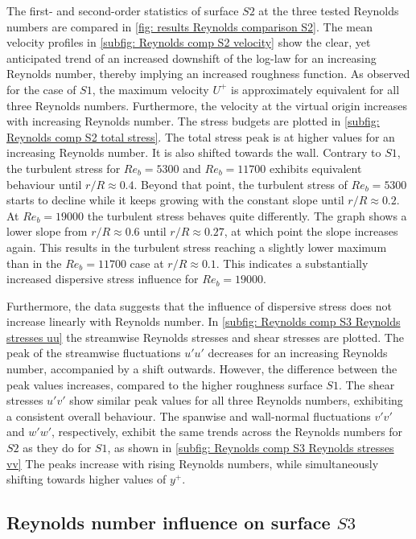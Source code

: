 The first- and second-order statistics of surface $S2$ at the three tested Reynolds numbers are compared in \autoref{fig: results Reynolds comparison S2}.
The mean velocity profiles in \autoref{subfig: Reynolds comp S2 velocity} show the clear, yet anticipated  trend of an increased downshift of the log-law for an increasing Reynolds number, thereby implying an increased roughness function.
As observed for the case of $S1$, the maximum velocity $U^+$ is approximately equivalent  for all three Reynolds numbers.
Furthermore, the velocity at the virtual origin increases with increasing Reynolds number.
The stress budgets are plotted in \autoref{subfig: Reynolds comp S2 total stress}.
The total stress peak is at higher values for an increasing Reynolds number.
It is also shifted towards the wall.
Contrary to $S1$, the turbulent stress for $Re_b = 5300$ and $Re_b = 11700$ exhibits equivalent behaviour  until $r/R \approx 0.4$.
Beyond that point, the turbulent stress of $Re_b = 5300$ starts to decline while it keeps growing with the constant slope until $r/R \approx 0.2$.
At $Re_b = 19000$ the turbulent stress behaves quite differently.
The graph shows a lower slope from $r/R \approx 0.6$ until $r/R \approx 0.27$, at which point the slope increases again. This results in the turbulent stress reaching a slightly lower maximum than in the $Re_b = 11700$ case at $r/R \approx 0.1$.
This indicates a substantially increased dispersive stress influence for $Re_b = 19000$.

Furthermore, the data suggests that the influence of dispersive stress does not increase linearly with Reynolds number.
In \autoref{subfig: Reynolds comp S3 Reynolds stresses uu} the streamwise Reynolds stresses and shear stresses are plotted.
The peak of the streamwise fluctuations $u'u'$ decreases for an increasing Reynolds number, accompanied by a shift outwards.
However, the difference between the peak values increases, compared to the higher roughness surface $S1$.
The shear stresses $u'v'$ show similar peak values for all three Reynolds numbers, exhibiting a consistent overall behaviour.
The spanwise and wall-normal fluctuations $v'v'$ and $w'w'$, respectively,  exhibit the same trends across the Reynolds numbers for $S2$ as they do for $S1$, as shown in \autoref{subfig: Reynolds comp S3 Reynolds stresses vv} 
The peaks increase with rising Reynolds numbers, while  simultaneously shifting towards higher values of  $y^+$.



\subsection{Reynolds number influence on surface $S3$}\label{subsec: Reynolds comp S3}

